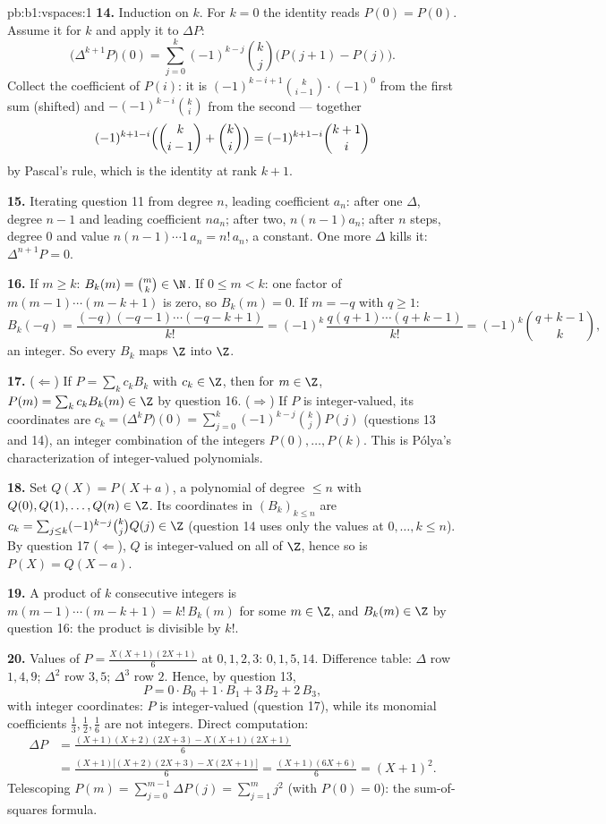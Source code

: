 \begin{solution}{pb:b1:vspaces:1}
\textbf{14.} Induction on $k$. For $k = 0$ the identity reads
$P(0) = P(0)$. Assume it for $k$ and apply it to $\Delta P$:
\[
\bigl(\Delta^{k+1} P\bigr)(0)
= \sum_{j=0}^{k} (-1)^{k-j}\binom kj \bigl(P(j+1) - P(j)\bigr).
\]
Collect the coefficient of $P(i)$: it is $(-1)^{k-i+1}\binom
k{i-1}\cdot(-1)^{0}$ from the first sum (shifted) and
$-(-1)^{k-i}\binom ki$ from the second --- together
\[
(-1)^{k+1-i}\Bigl(\binom k{i-1} + \binom ki\Bigr)
= (-1)^{k+1-i}\binom{k+1}i
\]
by Pascal's rule, which is the identity at rank $k + 1$.

\textbf{15.} Iterating question 11 from degree $n$, leading
coefficient $a_n$: after one $\Delta$, degree $n-1$ and leading
coefficient $n a_n$; after two, $n(n-1)a_n$; after $n$ steps,
degree $0$ and value $n(n-1)\cdots 1\, a_n = n!\,a_n$, a constant.
One more $\Delta$ kills it: $\Delta^{n+1}P = 0$.

\textbf{16.} If $m \geq k$: $B_k(m) = \binom mk \in \N$. If $0
\leq m < k$: one factor of $m(m-1)\cdots(m-k+1)$ is zero, so
$B_k(m) = 0$. If $m = -q$ with $q \geq 1$:
\[
B_k(-q) = \frac{(-q)(-q-1)\cdots(-q-k+1)}{k!}
= (-1)^k\,\frac{q(q+1)\cdots(q+k-1)}{k!}
= (-1)^k \binom{q+k-1}{k},
\]
an integer. So every $B_k$ maps $\Z$ into $\Z$.

\textbf{17.} ($\Leftarrow$) If $P = \sum_k c_k B_k$ with $c_k \in
\Z$, then for $m \in \Z$, $P(m) = \sum_k c_k B_k(m) \in \Z$ by
question 16. ($\Rightarrow$) If $P$ is integer-valued, its
coordinates are $c_k = \bigl(\Delta^k P\bigr)(0) = \sum_{j=0}^k
(-1)^{k-j}\binom kj P(j)$ (questions 13 and 14), an integer
combination of the integers $P(0), \dots, P(k)$. This is
P\'olya's characterization of integer-valued polynomials.

\textbf{18.} Set $Q(X) = P(X + a)$, a polynomial of degree $\leq
n$ with $Q(0), Q(1), \dots, Q(n) \in \Z$. Its coordinates in
$(B_k)_{k \leq n}$ are $c_k = \sum_{j \leq k}(-1)^{k-j}\binom kj
Q(j) \in \Z$ (question 14 uses only the values at $0, \dots, k
\leq n$). By question 17 ($\Leftarrow$), $Q$ is integer-valued on
all of $\Z$, hence so is $P(X) = Q(X - a)$.

\textbf{19.} A product of $k$ consecutive integers is $m(m-1)
\cdots(m-k+1) = k!\,B_k(m)$ for some $m \in \Z$, and $B_k(m) \in
\Z$ by question 16: the product is divisible by $k!$.

\textbf{20.} Values of $P = \frac{X(X+1)(2X+1)}{6}$ at $0,1,2,3$:
$0, 1, 5, 14$. Difference table: $\Delta$ row $1, 4, 9$;
$\Delta^2$ row $3, 5$; $\Delta^3$ row $2$. Hence, by question 13,
\[
P = 0\cdot B_0 + 1\cdot B_1 + 3\,B_2 + 2\,B_3 ,
\]
with integer coordinates: $P$ is integer-valued (question 17),
while its monomial coefficients $\frac13, \frac12, \frac16$ are
not integers. Direct computation:
\begin{align*}
\Delta P &= \frac{(X+1)(X+2)(2X+3) - X(X+1)(2X+1)}{6} \\
&= \frac{(X+1)\bigl[(X+2)(2X+3) - X(2X+1)\bigr]}{6}
= \frac{(X+1)(6X+6)}{6} = (X+1)^2 .
\end{align*}
Telescoping $P(m) = \sum_{j=0}^{m-1}\Delta P(j) = \sum_{j=1}^{m}
j^2$ (with $P(0) = 0$): the sum-of-squares formula.


\end{solution}
